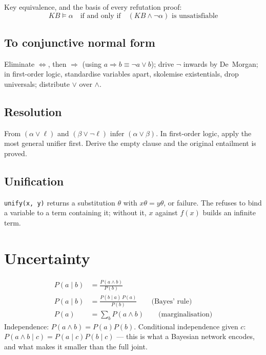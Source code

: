 Key equivalence, and the basis of every refutation proof:
\[
  \mathit{KB} \models \alpha
  \quad\text{if and only if}\quad
  (\mathit{KB} \wedge \neg\alpha) \text{ is unsatisfiable}
\]

\subsection*{To conjunctive normal form}

Eliminate $\Leftrightarrow$, then $\Rightarrow$ (using
$a \Rightarrow b \equiv \neg a \vee b$); drive $\neg$ inwards by De~Morgan; in
first-order logic, standardise variables apart, skolemise existentials, drop
universals; distribute $\vee$ over $\wedge$.

\subsection*{Resolution}

From $(\alpha \vee \ell)$ and $(\beta \vee \neg\ell)$ infer
$(\alpha \vee \beta)$. In first-order logic, apply the most general unifier first.
Derive the empty clause and the original entailment is proved.

\subsection*{Unification}

\texttt{unify(x, y)} returns a substitution $\theta$ with
$x\theta = y\theta$, or failure. The  refuses to bind a
variable to a term containing it; without it, $x$ against $f(x)$ builds an
infinite term.

\section{Uncertainty}

\begin{align*}
  P(a \mid b) &= \frac{P(a \wedge b)}{P(b)} \\[4pt]
  P(a \mid b) &= \frac{P(b \mid a)\,P(a)}{P(b)}
    \qquad\text{(Bayes' rule)} \\[4pt]
  P(a) &= \textstyle\sum_{b} P(a \wedge b)
    \qquad\text{(marginalisation)}
\end{align*}
Independence: $P(a \wedge b) = P(a)P(b)$. Conditional independence given $c$:
$P(a \wedge b \mid c) = P(a \mid c) P(b \mid c)$ --- this is what a Bayesian
network encodes, and what makes it smaller than the full joint.


